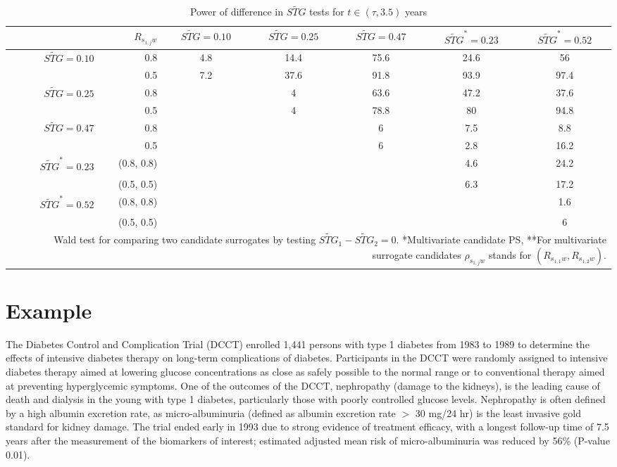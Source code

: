 \documentclass[times, doublespace]{simauth}
\begin{document}
\begin{table}
\begin{center}
\caption{Power of difference in $\widetilde{STG}$ tests for $t \in (\tau, 3.5)$ years \label{IPow}}
\begin{tabular}{rrccccc}
  \hline
 & $R_{s_{1,j}w}$ & $\widetilde{STG}=0.10$  & $\widetilde{STG}=0.25$  & $\widetilde{STG}=0.47$& $\widetilde{STG}^*=0.23$  & $\widetilde{STG}^*=0.52$\\
  \hline
$\widetilde{STG}=0.10$ & 0.8 & 4.8 & 14.4 & 75.6 & 24.6 & 56 \\ 
&  0.5  & 7.2 & 37.6 & 91.8 & 93.9 & 97.4 \\ 
 $\widetilde{STG}=0.25$ & 0.8 &  & 4 & 63.6 & 47.2 & 37.6 \\ 
&  0.5 &  & 4 & 78.8 & 80 & 94.8 \\ 
$\widetilde{STG}=0.47$ & 0.8 &  &  & 6 & 7.5 & 8.8 \\ 
 & 0.5 &  &  & 6 & 2.8 & 16.2 \\ 
$\widetilde{STG}^{*}=0.23$ & (0.8, 0.8) &  &  &  & 4.6 & 24.2 \\ 
&  (0.5, 0.5) &  &  &  & 6.3 & 17.2 \\ 
$\widetilde{STG}^{*}=0.52$ & (0.8, 0.8) &  &  &  &  & 1.6 \\ 
 & (0.5, 0.5) &  &  &  &  & 6 \\ 
   \hline
\multicolumn{7}{p{9in}}{Wald test for comparing two candidate surrogates by testing $\widetilde{STG}_1-\widetilde{STG}_2=0$. *Multivariate candidate PS, **For multivariate surrogate candidates $\rho_{s_{1,j}w}$ stands for $(R_{s_{1,1}w},R_{s_{1,2}w})$.}
\end{tabular}
\end{center}
\end{table}


\section{Example}
The Diabetes Control and Complication Trial (DCCT) enrolled 1,441 persons with type 1 diabetes from 1983 to 1989 to determine the effects of intensive diabetes therapy on long-term complications of diabetes. Participants in the DCCT were randomly assigned to intensive diabetes therapy aimed at lowering glucose concentrations as close as safely possible to the normal range or to conventional therapy aimed at preventing hyperglycemic symptoms. One of the outcomes of the DCCT, nephropathy (damage to the kidneys), is the leading cause of death and dialysis in the young with type 1 diabetes, particularly those with poorly controlled glucose levels. Nephropathy is often defined by a high albumin excretion rate, as micro-albuminuria (defined as albumin excretion rate $>$ 30 mg/24 hr) is the least invasive gold standard for kidney damage. The trial ended early in 1993 due to strong evidence of treatment efficacy, with a longest follow-up time of 7.5 years after the measurement of the biomarkers of interest; estimated adjusted mean risk of micro-albuminuria was reduced by 56\% (P-value 0.01)\citep{DCCT}. 
\end{document}
